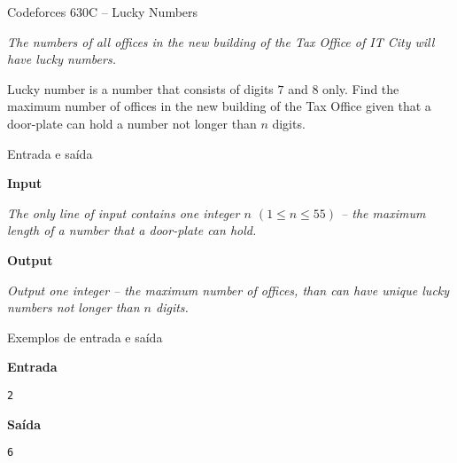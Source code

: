 \begin{frame}[fragile]{Codeforces 630C -- Lucky Numbers}

{\it
The numbers of all offices in the new building of the Tax Office of IT City will have lucky numbers.

Lucky number is a number that consists of digits $7$ and $8$ only. Find the maximum number of offices in the new building of the Tax Office given that a door-plate can hold a number not longer than $n$ digits.
}

\end{frame}

\begin{frame}[fragile]{Entrada e saída}

\textbf{Input}

{\it
The only line of input contains one integer $n$ $(1 \leq n \leq 55)$ -- the maximum length of a number that a door-plate can hold.}

\vspace{0.2in}

\textbf{Output}

{\it
Output one integer -- the maximum number of offices, than can have unique lucky numbers not longer than $n$ digits.
}

\end{frame}

\begin{frame}[fragile]{Exemplos de entrada e saída}

\begin{minipage}[t]{0.45\textwidth}
\textbf{Entrada}
\begin{verbatim}
2
\end{verbatim}
\end{minipage}
\begin{minipage}[t]{0.5\textwidth}
\textbf{Saída}
\begin{verbatim}
6
\end{verbatim}
\end{minipage}

\end{frame}

